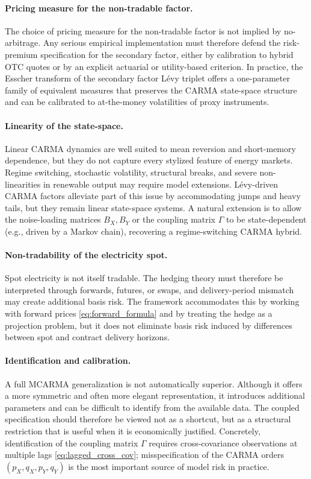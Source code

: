 \documentclass[10pt,a4paper,reqno]{amsart}
\newcommand{\1}{\mathbbm{1}}
\begin{document}
\paragraph{Pricing measure for the non-tradable factor.}
The choice of pricing measure for the non-tradable factor is not implied
by no-arbitrage. Any serious empirical implementation must therefore defend the
risk-premium specification for the secondary factor, either by calibration to
hybrid OTC quotes or by an explicit actuarial or utility-based criterion.
In practice, the Esscher transform of the secondary factor Lévy triplet offers a
one-parameter family of equivalent measures that preserves the CARMA state-space
structure and can be calibrated to at-the-money volatilities of proxy instruments.

\paragraph{Linearity of the state-space.}
Linear CARMA dynamics are well suited to mean reversion and short-memory
dependence, but they do not capture every stylized feature of energy markets.
Regime switching, stochastic volatility, structural breaks, and severe
non-linearities in renewable output may require model extensions. Lévy-driven
CARMA factors alleviate part of this issue by accommodating jumps and heavy
tails, but they remain linear state-space systems. A natural extension is to
allow the noise-loading matrices $B_X, B_Y$ or the coupling matrix
$\Gamma$ to be state-dependent (e.g., driven by a Markov chain), recovering
a regime-switching CARMA hybrid.

\paragraph{Non-tradability of the electricity spot.}
Spot electricity is not itself tradable. The hedging theory must therefore be
interpreted through forwards, futures, or swaps, and delivery-period mismatch
may create additional basis risk. The framework accommodates this by working
with forward prices \eqref{eq:forward_formula} and by treating the hedge as a
projection problem, but it does not eliminate basis risk induced by differences
between spot and contract delivery horizons.

\paragraph{Identification and calibration.}
A full MCARMA generalization is not automatically superior. Although it offers a
more symmetric and often more elegant representation, it introduces additional
parameters and can be difficult to identify from the available data. The coupled
specification should therefore be viewed not as a shortcut, but as a structural
restriction that is useful when it is economically justified. Concretely,
identification of the coupling matrix $\Gamma$ requires cross-covariance
observations at multiple lags \eqref{eq:lagged_cross_cov}; misspecification of
the CARMA orders $(p_X,q_X,p_Y,q_Y)$ is the most important source of model
risk in practice.
\end{document}
